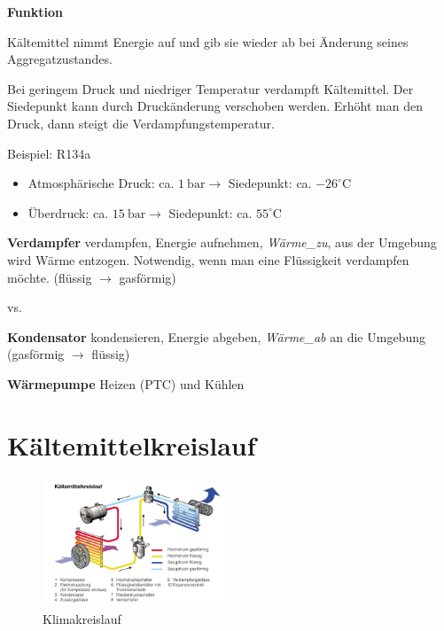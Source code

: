\textbf{Funktion}

Kältemittel nimmt Energie auf und gib sie wieder ab bei Änderung seines
Aggregatzustandes.

Bei geringem Druck und niedriger Temperatur verdampft Kältemittel. Der
Siedepunkt kann durch Druckänderung verschoben werden. Erhöht man den
Druck, dann steigt die Verdampfungstemperatur.

Beispiel: R134a

\begin{itemize}
\item
  Atmosphärische Druck: ca. $1~\text{bar} \to$ Siedepunkt: ca.
  $-26^\circ \text{C}$
\item
  Überdruck: ca. $15~\text{bar} \to$ Siedepunkt: ca.
  $55^\circ \text{C}$
\end{itemize}

\textbf{Verdampfer} verdampfen, Energie aufnehmen, \emph{Wärme\_zu}, aus
der Umgebung wird Wärme entzogen. Notwendig, wenn man eine Flüssigkeit
verdampfen möchte. (flüssig $\to$ gasförmig)

vs.

\textbf{Kondensator} kondensieren, Energie abgeben, \emph{Wärme\_ab} an
die Umgebung (gasförmig $\to$ flüssig)

\textbf{Wärmepumpe} Heizen (PTC) und Kühlen

\section{Kältemittelkreislauf}\label{kaeltemittelkreislauf}

\begin{figure}[!ht]%
\centering
\includegraphics[width=0.5\textwidth]{images/Skizze/Klimakreislauf-1.pdf}
\caption{Klimakreislauf}
\end{figure}

